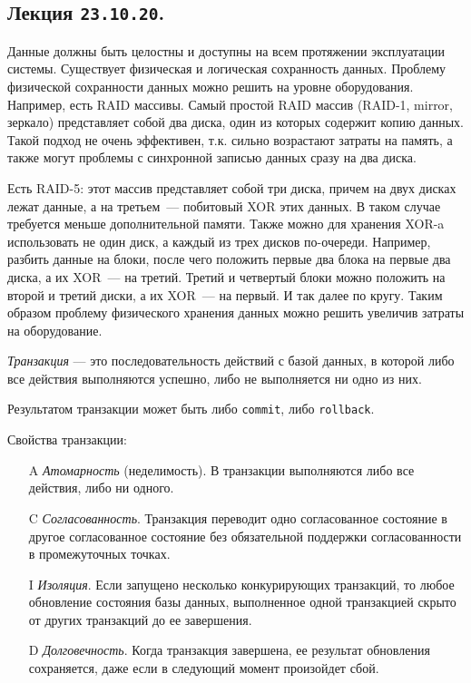 \subsection{%
  Лекция \texttt{23.10.20}.%
}


Данные должны быть целостны и доступны на всем протяжении эксплуатации системы.
Существует физическая и логическая сохранность данных. Проблему физической
сохранности данных можно решить на уровне оборудования. Например, есть RAID
массивы. Самый простой RAID массив (RAID-1, mirror, зеркало) представляет собой
два диска, один из которых содержит копию данных. Такой подход не очень
эффективен, т.к. сильно возрастают затраты на память, а также могут проблемы с
синхронной записью данных сразу на два диска.

Есть RAID-5: этот массив представляет собой три диска, причем на двух
дисках лежат данные, а на третьем~--- побитовый XOR этих данных. В таком случае
требуется меньше дополнительной памяти. Также можно для хранения XOR-a
использовать не один диск, а каждый из трех дисков по-очереди. Например, разбить
данные на блоки, после чего положить первые два блока на первые два диска, а их
XOR~--- на третий. Третий и четвертый блоки можно положить на второй и третий
диски, а их XOR~--- на первый. И так далее по кругу. Таким образом проблему
физического хранения данных можно решить увеличив затраты на оборудование.

\begin{definition}
  \textit{Транзакция} --- это последовательность действий с базой данных, 
  в которой либо все действия выполняются успешно, либо не выполняется ни одно из них.

  Результатом транзакции может быть либо \texttt{commit}, либо
  \texttt{rollback}.
\end{definition}

Свойства транзакции:

\begin{enumerate}
\item[A]
  \textit{Атомарность} (неделимость). 
  В транзакции выполняются либо все действия, либо ни одного.

\item[C]
  \textit{Согласованность}.
  Транзакция переводит одно согласованное состояние в другое
  согласованное состояние без обязательной поддержки согласованности в
  промежуточных точках.

\item[I]
  \textit{Изоляция}. Если запущено несколько конкурирующих транзакций, то любое
  обновление состояния базы данных, выполненное одной транзакцией скрыто от
  других транзакций до ее завершения.

\item[D]
  \textit{Долговечность}. Когда транзакция завершена, ее результат обновления
  сохраняется, даже если в следующий момент произойдет сбой.
\end{enumerate}


